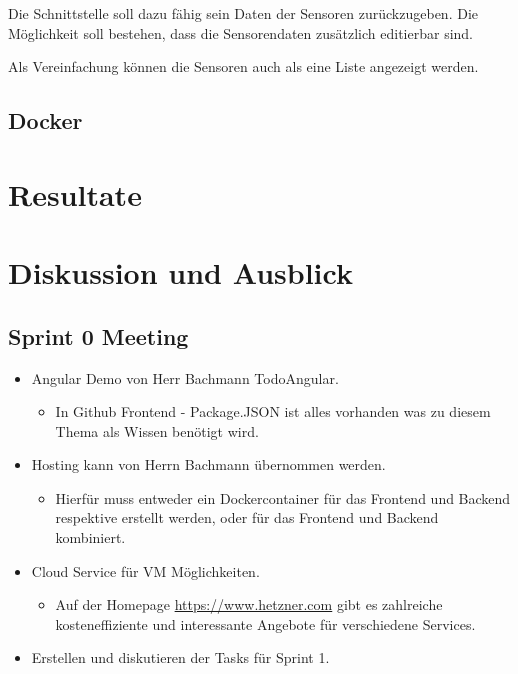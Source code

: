 \documentclass[a4paper]{article}
\begin{document}
	Die Schnittstelle soll dazu fähig sein Daten der Sensoren zurückzugeben. Die Möglichkeit soll bestehen, dass die Sensorendaten zusätzlich editierbar sind.
	
	Als Vereinfachung können die Sensoren auch als eine Liste angezeigt werden.
	
	\subsection{Docker}
	
	
	\section{Resultate}
	\section{Diskussion und Ausblick}
	
	\subsection{Sprint 0 Meeting}
	\begin{itemize}
		\item Angular Demo von  Herr Bachmann TodoAngular.
		\begin{itemize}
			\item In Github Frontend - Package.JSON ist alles vorhanden was zu diesem Thema als Wissen benötigt wird.
		\end{itemize}
		\item Hosting kann von Herrn Bachmann übernommen werden.
		\begin{itemize}
			\item Hierfür muss entweder ein Dockercontainer für das Frontend und Backend respektive erstellt werden, oder für das Frontend und Backend kombiniert.
		\end{itemize}
		\item Cloud Service für VM Möglichkeiten.
		\begin{itemize}
			\item Auf der Homepage \url{https://www.hetzner.com} gibt es zahlreiche kosteneffiziente und interessante Angebote für verschiedene Services.
		\end{itemize}
		\item Erstellen und diskutieren der Tasks für Sprint 1.
	\end{itemize}	
	
\end{document}

